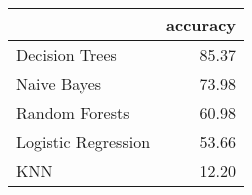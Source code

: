 \begin{tabular}{lr}
\toprule
{} &  accuracy \\
\midrule
Decision Trees      &     85.37 \\
Naive Bayes         &     73.98 \\
Random Forests      &     60.98 \\
Logistic Regression &     53.66 \\
KNN                 &     12.20 \\
\bottomrule
\end{tabular}

